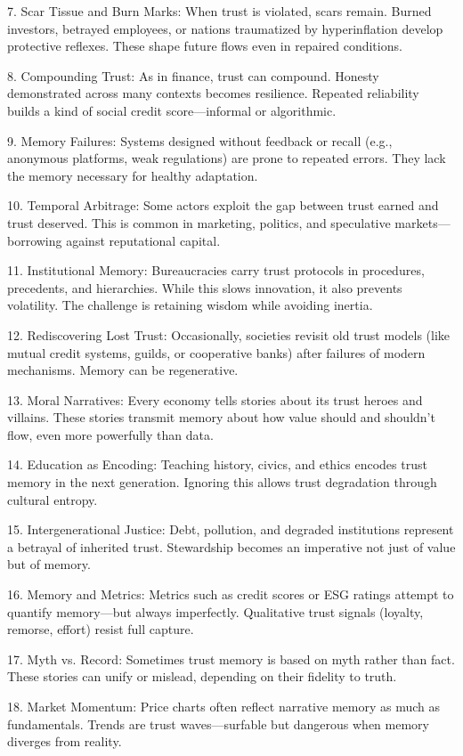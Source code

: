 \documentclass[11pt,oneside]{book}
\begin{document}
7. Scar Tissue and Burn Marks: When trust is violated, scars remain. Burned investors, betrayed employees, or nations traumatized by hyperinflation develop protective reflexes. These shape future flows even in repaired conditions.

8. Compounding Trust: As in finance, trust can compound. Honesty demonstrated across many contexts becomes resilience. Repeated reliability builds a kind of social credit score—informal or algorithmic.

9. Memory Failures: Systems designed without feedback or recall (e.g., anonymous platforms, weak regulations) are prone to repeated errors. They lack the memory necessary for healthy adaptation.

10. Temporal Arbitrage: Some actors exploit the gap between trust earned and trust deserved. This is common in marketing, politics, and speculative markets—borrowing against reputational capital.

11. Institutional Memory: Bureaucracies carry trust protocols in procedures, precedents, and hierarchies. While this slows innovation, it also prevents volatility. The challenge is retaining wisdom while avoiding inertia.

12. Rediscovering Lost Trust: Occasionally, societies revisit old trust models (like mutual credit systems, guilds, or cooperative banks) after failures of modern mechanisms. Memory can be regenerative.

13. Moral Narratives: Every economy tells stories about its trust heroes and villains. These stories transmit memory about how value should and shouldn’t flow, even more powerfully than data.

14. Education as Encoding: Teaching history, civics, and ethics encodes trust memory in the next generation. Ignoring this allows trust degradation through cultural entropy.

15. Intergenerational Justice: Debt, pollution, and degraded institutions represent a betrayal of inherited trust. Stewardship becomes an imperative not just of value but of memory.

16. Memory and Metrics: Metrics such as credit scores or ESG ratings attempt to quantify memory—but always imperfectly. Qualitative trust signals (loyalty, remorse, effort) resist full capture.

17. Myth vs. Record: Sometimes trust memory is based on myth rather than fact. These stories can unify or mislead, depending on their fidelity to truth.

18. Market Momentum: Price charts often reflect narrative memory as much as fundamentals. Trends are trust waves—surfable but dangerous when memory diverges from reality.
\end{document}
